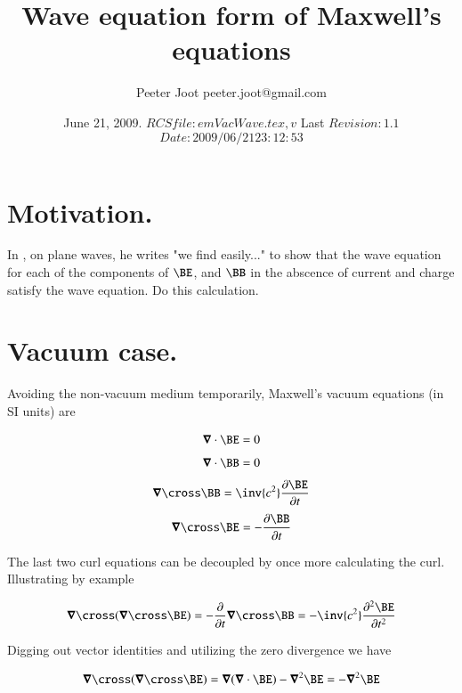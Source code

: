 \documentclass{article}
\title{Wave equation form of Maxwell's equations}
\author{Peeter Joot \quad peeter.joot@gmail.com }
\date{ June 21, 2009.  $RCSfile: emVacWave.tex,v $ Last $Revision: 1.1 $ $Date: 2009/06/21 23:12:53 $ }
\begin{document}
\maketitle{}
\tableofcontents

\section{Motivation.}

In \cite{jackson1975cew}, on plane waves, he writes "we find easily..." to show that the wave equation for each of the components
of $\BE$, and $\BB$ in the abscence of current and charge satisfy the wave equation.  Do this calculation.

\section{Vacuum case.}

Avoiding the non-vacuum medium temporarily, Maxwell's vacuum equations (in SI units) are

\begin{align}\label{eqn:divE}
\spacegrad \cdot \BE = 0
\end{align}
\begin{align}\label{eqn:divB}
\spacegrad \cdot \BB = 0
\end{align}
\begin{align}\label{eqn:curlB}
\spacegrad \cross \BB = \inv{c^2} \frac{\partial \BE}{\partial t}
\end{align}
\begin{align}\label{eqn:curlE}
\spacegrad \cross \BE = -\frac{\partial \BB}{\partial t}
\end{align}

The last two curl equations can be decoupled by once more calculating the curl.
Illustrating by example

\begin{align}\label{eqn:curlCurlE}
\spacegrad \cross (\spacegrad \cross \BE) = -\frac{\partial }{\partial t} \spacegrad \cross \BB = -\inv{c^2} \frac{\partial^2 \BE}{\partial t^2}
\end{align}

Digging out vector identities and utilizing the zero divergence we have

\begin{align}\label{eqn:identForcurlCurlE}
\spacegrad \cross (\spacegrad \cross \BE) = \spacegrad (\spacegrad \cdot \BE) - \spacegrad^2 \BE = -\spacegrad^2 \BE
\end{align}
\end{document}

